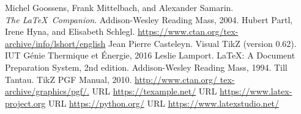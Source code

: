 \documentclass[a4paper,openany,12pt]{book}
\begin{document}
\begin{thebibliography}{9}
\begin{english}
	\textenglish{
	Michel Goossens, Frank Mittelbach, and Alexander Samarin. \\
	\textit{The \LaTeX\ Companion}. 
	Addison-Wesley Reading Mass, 2004.
	}
	\textenglish{
	Hubert Partl, Irene Hyna, and Elisabeth Schlegl. 
	\url{https://www.ctan.org/tex-archive/info/lshort/english}
	}
	\textenglish{
	Jean Pierre Casteleyn. Visual TikZ (version 0.62). IUT Génie Thermique et
Énergie, 2016
	}
	\textenglish{
	Leslie Lamport. \LaTeX: A Document Preparation System, 2nd edition.
Addison-Wesley Reading Mass, 1994.
	}
	\textenglish{
	Till Tantau. TikZ PGF Manual, 2010. \url{http://www.ctan.org/
tex-archive/graphics/pgf/.}
	}
	\textenglish{
	URL \url{https://texample.net/}
	}
	\textenglish{
	URL \url{https://www.latex-project.org}
	}
	\textenglish{
	URL \url{https://python.org/}
	}
	\textenglish{
	URL \url{https://www.latexstudio.net/}
	}
\end{english}
\end{thebibliography}
\end{document}
